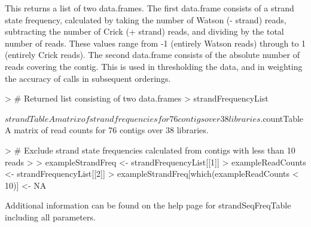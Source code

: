\documentclass{article}
\begin{document}
\begin{Schunk}
\end{Schunk}

This returns a list of two data.frames.  The first data.frame consists of a strand state frequency, calculated by taking the number of Watson (- strand) reads, subtracting the number of Crick (+ strand) reads, and dividing by the total number of reads.  These values range from -1 (entirely Watson reads) through to 1 (entirely Crick reads).  The second data.frame consists of the absolute number of reads covering the contig. This is used in thresholding the data, and in weighting the accuracy of calls in subsequent orderings.

\begin{Schunk}
\begin{Sinput}
> # Returned list consisting of two data.frames
> strandFrequencyList
\end{Sinput}
\begin{Soutput}
$strandTable
A matrix of strand frequencies for  76  contigs over  38  libraries.

$countTable
A matrix of read counts for  76  contigs over  38  libraries.
\end{Soutput}
\begin{Sinput}
> # Exclude strand state frequencies calculated from contigs with less than 10 reads
> 
> exampleStrandFreq <- strandFrequencyList[[1]]
> exampleReadCounts <- strandFrequencyList[[2]]
> exampleStrandFreq[which(exampleReadCounts < 10)] <- NA 
\end{Sinput}
\end{Schunk}

Additional information can be found on the help page for strandSeqFreqTable including all parameters.\\
\end{document}
